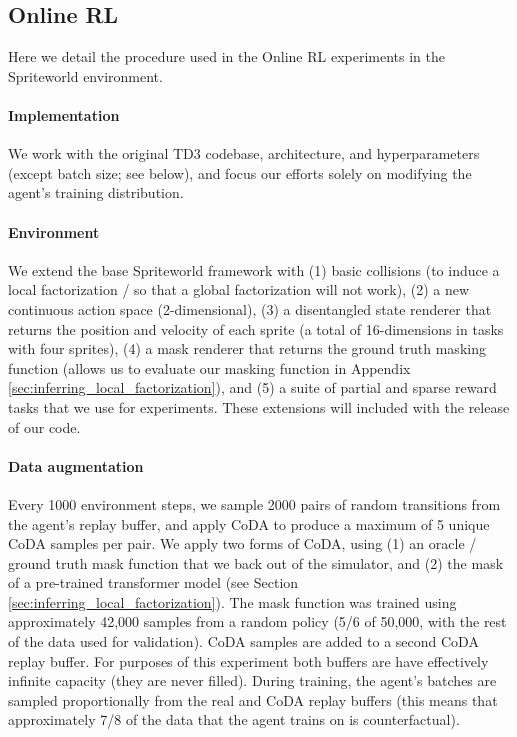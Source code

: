 \documentclass[coda.tex]{subfiles}
\begin{document}
\subsection{Online RL}
Here we detail the procedure used in the Online RL experiments in the Spriteworld environment.

\paragraph{Implementation} We work
with the original TD3 codebase, architecture, and hyperparameters (except batch size; see below), and focus our
efforts solely on modifying the agent’s training distribution.

\paragraph{Environment} We extend the base Spriteworld framework \cite{watters2019cobra} with (1) basic collisions (to induce a local factorization / so that a global factorization will not work), (2) a new continuous action space (2-dimensional), (3) a disentangled state renderer that returns the position and velocity of each sprite (a total of 16-dimensions in tasks with four sprites), (4) a mask renderer that returns the ground truth masking function (allows us to evaluate our masking function in Appendix \ref{sec:inferring_local_factorization}), and (5) a suite of partial and sparse reward tasks that we use for experiments. These extensions will included with the release of our code.

\paragraph{Data augmentation}
Every 1000 environment steps, we sample 2000 pairs of random transitions from the agent's replay buffer, and apply CoDA to produce a maximum of 5 unique CoDA samples per pair. We apply two forms of CoDA, using (1) an oracle / ground truth mask function that we back out of the simulator, and (2) the mask of a pre-trained transformer model (see Section \ref{sec:inferring_local_factorization}).
The mask function was trained using approximately 42,000 samples from a random policy (5/6 of 50,000, with the rest of the data used for validation). CoDA samples are added to a second CoDA replay buffer. For purposes of this experiment both buffers are have effectively infinite capacity (they are never filled). During training, the agent's batches are sampled proportionally from the real and CoDA replay buffers (this means that approximately 7/8 of the data that the agent trains on is counterfactual).
\end{document}
